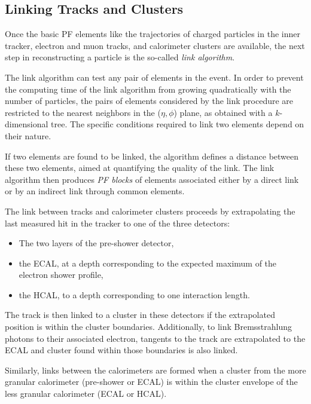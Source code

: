 \subsection{Linking Tracks and Clusters}
Once the basic PF elements like the trajectories of charged particles in the inner tracker, electron and muon tracks, and calorimeter clusters are available, the next step in reconstructing a particle is the so-called \textit{link algorithm}.

 The link algorithm can test any pair of elements in the event. In order to prevent the computing time of the link algorithm from growing quadratically with the number of particles, the pairs of elements considered by the link procedure are restricted to the nearest neighbors in the ($\eta,\phi$) plane, as obtained with a $k$-dimensional tree\cite{Bentley1975MultidimensionalBS}. The specific conditions required to link two elements depend on their nature.

 If two elements are found to be linked, the algorithm defines a distance between these two elements, aimed at quantifying the quality of the link. The link algorithm then produces \textit{PF blocks} of elements associated either by a direct link or by an indirect link through common elements.

 The link between tracks and calorimeter clusters proceeds by extrapolating the last measured hit in the tracker to one of the three detectors\cite{CMS:2009nxa}:

 \begin{itemize}
 	\item The two layers of the pre-shower detector,
 	\item the ECAL, at a depth corresponding to the expected maximum of the electron shower profile,
 	\item the HCAL, to a depth corresponding to one interaction length.
 \end{itemize}

 The track is then linked to a cluster in these detectors if the extrapolated position is within the cluster boundaries. Additionally, to link Bremsstrahlung photons to their associated electron, tangents to the track are extrapolated to the ECAL and cluster found within those boundaries is also linked.

 Similarly, links between the calorimeters are formed when a cluster from the more granular calorimeter (pre-shower or ECAL) is within the cluster envelope of the less granular calorimeter (ECAL or HCAL).

